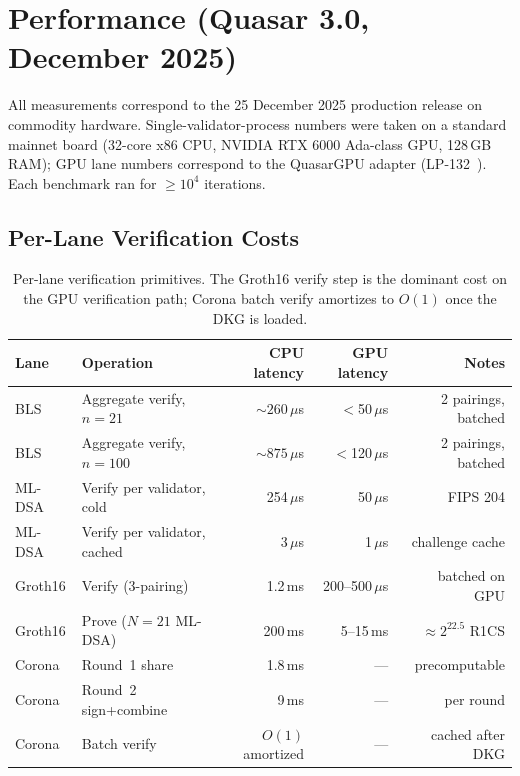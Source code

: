 \section{Performance (Quasar 3.0, December 2025)}

\label{sec:performance}

All measurements correspond to the 25 December 2025 production release on
commodity hardware. Single-validator-process numbers were taken on a
standard mainnet board (32-core x86 CPU, NVIDIA RTX 6000 Ada-class GPU,
128\,GB RAM); GPU lane numbers correspond to the QuasarGPU adapter
(LP-132~\cite{lp132-quasargpu}). Each benchmark ran for $\geq 10^4$
iterations.

\subsection{Per-Lane Verification Costs}
\label{sec:gpu-native}

\begin{table}[ht]
\centering
\small
\begin{tabular}{@{}llrrr@{}}
\toprule
\textbf{Lane} & \textbf{Operation} &
\textbf{CPU latency} & \textbf{GPU latency} &
\textbf{Notes} \\
\midrule
BLS    & Aggregate verify, $n{=}21$  & ${\sim}260\,\mu$s & $<$50\,$\mu$s &
        2 pairings, batched \\
BLS    & Aggregate verify, $n{=}100$ & ${\sim}875\,\mu$s & $<$120\,$\mu$s &
        2 pairings, batched \\
\midrule
ML-DSA & Verify per validator, cold  & 254\,$\mu$s        & 50\,$\mu$s    &
        FIPS 204 \\
ML-DSA & Verify per validator, cached& 3\,$\mu$s          & 1\,$\mu$s     &
        challenge cache \\
\midrule
Groth16 & Verify (3-pairing)         & 1.2\,ms            & 200--500\,$\mu$s &
        batched on GPU \\
Groth16 & Prove ($N{=}21$ ML-DSA)    & 200\,ms            & 5--15\,ms     &
        $\approx 2^{22.5}$ R1CS \\
\midrule
Corona & Round~1 share              & 1.8\,ms            & ---           &
        precomputable \\
Corona & Round~2 sign+combine       & 9\,ms              & ---           &
        per round \\
Corona & Batch verify               & $O(1)$ amortized   & ---           &
        cached after DKG \\
\bottomrule
\end{tabular}
\caption{Per-lane verification primitives. The Groth16 verify step is
the dominant cost on the GPU verification path; Corona batch verify
amortizes to $O(1)$ once the DKG is loaded.}
\label{tab:per-lane}
\end{table}

